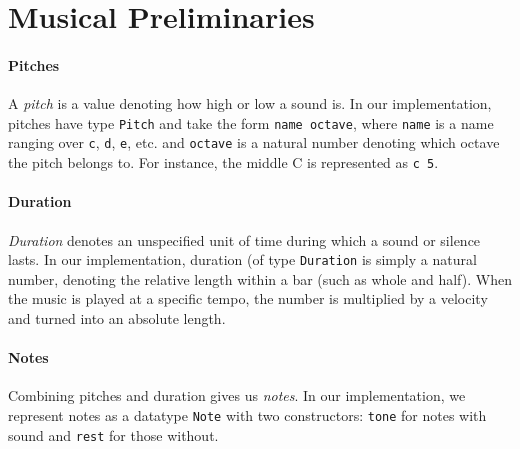 \section{Musical Preliminaries}
\label{sec:music}

\paragraph{Pitches}
A \emph{pitch} is a value denoting how high or low a sound is.
In our implementation, pitches have type \texttt{Pitch} and take the
form \texttt{name octave}, where \texttt{name} is a name ranging
over \texttt{c}, \texttt{d}, \texttt{e}, etc. and \texttt{octave} is a
natural number denoting which octave the pitch belongs to.
For instance, the middle C is represented as \texttt{c 5}.




\paragraph{Duration}
\emph{Duration} denotes an unspecified unit of time during which a
sound or silence lasts.
In our implementation, duration (of type \texttt{Duration} is simply
a natural number, denoting the relative length within a bar (such as
whole and half).
When the music is played at a specific tempo, the number is 
multiplied by a velocity and turned into an absolute length.


\paragraph{Notes}
Combining pitches and duration gives us \emph{notes}.
In our implementation, we represent notes as a datatype \texttt{Note}
with two constructors: \texttt{tone} for notes with sound and
\texttt{rest} for those without.


